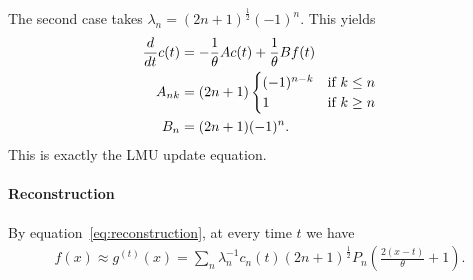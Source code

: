 \documentclass[../../hippo]{subfiles}
\begin{document}
The second case takes $\lambda_n = (2n+1)^{\frac{1}{2}} (-1)^{n}$.
This yields
\begin{align*}
  \frac{d}{d t} c(t) &= -\frac{1}{\theta} A c(t) + \frac{1}{\theta} B f(t)
  \\
  A_{nk} &=
  (2n+1)
  \begin{cases}
    (-1)^{n-k} & \mbox{if } k \le n \\
    1          & \mbox{if } k \ge n
  \end{cases}
  \\
  B_n &= (2n+1) (-1)^{n}
  .
\end{align*}
This is exactly the LMU update equation.


\paragraph{Reconstruction}

By equation~\eqref{eq:reconstruction}, at every time $t$ we have
\begin{align*}
  f(x) \approx g^{(t)}(x) = \sum_n \lambda_n^{-1} c_n(t) (2n+1)^{\frac{1}{2}} P_n\left( \frac{2(x-t)}{\theta} + 1 \right).
\end{align*}
\end{document}
